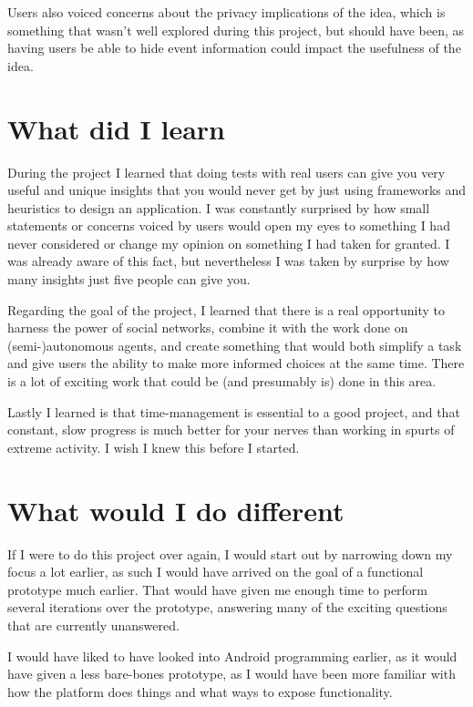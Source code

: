 \documentclass[a4paper,11pt]{report}
\begin{document}
Users also voiced concerns about the privacy implications of the idea, which is
something that wasn't well explored during this project, but should have been,
as having users be able to hide event information could impact the usefulness of
the idea.

\section{What did I learn}

During the project I learned that doing tests with real users can give you very
useful and unique insights that you would never get by just using frameworks and
heuristics to design an application. I was constantly surprised by how small
statements or concerns voiced by users would open my eyes to something I had
never considered or change my opinion on something I had taken for granted. I
was already aware of this fact, but nevertheless I was taken by surprise by how
many insights just five people can give you.

Regarding the goal of the project, I learned that there is a real opportunity to
harness the power of social networks, combine it with the work done on
(semi-)autonomous agents, and create something that would both simplify a task
and give users the ability to make more informed choices at the same time. There
is a lot of exciting work that could be (and presumably is) done in this area.

Lastly I learned is that time-management is essential to a good project, and
that constant, slow progress is much better for your nerves than working in
spurts of extreme activity. I wish I knew this before I started.

\section{What would I do different}

If I were to do this project over again, I would start out by narrowing down my
focus a lot earlier, as such I would have arrived on the goal of a functional
prototype much earlier. That would have given me enough time to perform several
iterations over the prototype, answering many of the exciting questions that are
currently unanswered.

I would have liked to have looked into Android programming earlier, as it would
have given a less bare-bones prototype, as I would have been more familiar with
how the platform does things and what ways to expose functionality.
\end{document}
